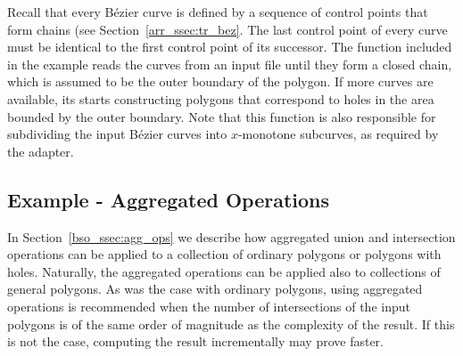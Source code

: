 Recall that every B\'ezier curve is defined by a sequence of control
points that form chains (see Section~\ref{arr_ssec:tr_bez}. The last
control point of every curve must be identical to the first control
point of its successor. The function 
included in the example reads the curves from an input file until they
form a closed chain, which is assumed to be the outer boundary of the
polygon. If more curves are available, its starts constructing
polygons that correspond to holes in the area bounded by the outer
boundary. Note that this function is also responsible for subdividing
the input B\'ezier curves into $x$-monotone subcurves, as required by
the  adapter.


\subsection{Example - Aggregated Operations\label{bso_ssec:aggregated_gen_ops}}

In Section~\ref{bso_ssec:agg_ops} we describe how aggregated union
and intersection operations can be applied to a collection of ordinary
polygons or polygons with holes. Naturally, the aggregated operations
can be applied also to collections of general polygons. As was the
case with ordinary polygons, using aggregated operations is
recommended when the number of intersections of the input polygons
is of the same order of magnitude as the complexity of the result. If
this is not the case, computing the result incrementally may prove
faster.

